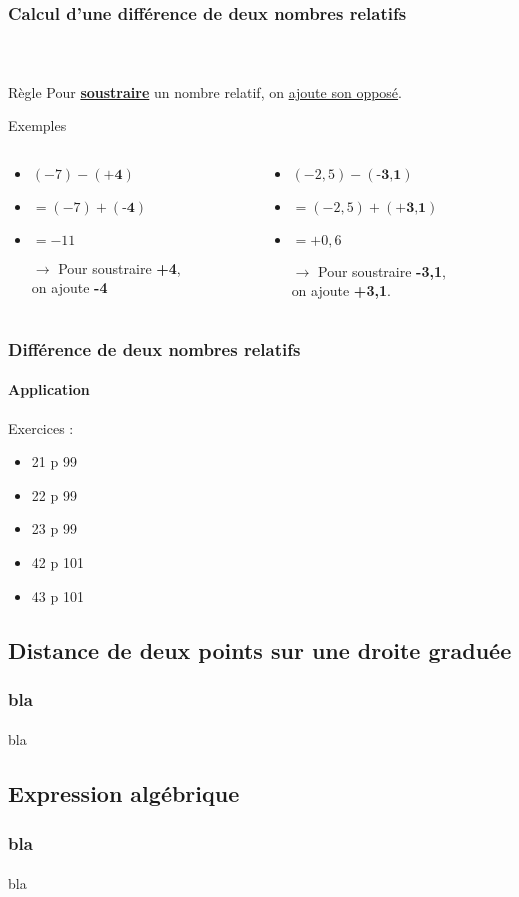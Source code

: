 \documentclass{beamer}
\begin{document}
\begin{frame}
	\frametitle{Calcul d'une différence de deux nombres relatifs}  
	\framesubtitle{\ }	
	
	\begin{block}{Règle}
		Pour \textbf{\underline{soustraire}} un nombre relatif, on \underline{ajoute son opposé}.
	\end{block}
	
	\begin{exampleblock}{Exemples}
		\begin{columns}[onlytextwidth]
			\begin{column}{0.5\textwidth}
				\begin{itemize}
					\item $ (-7) - (\textbf{+4}) $
					\item $= (-7) + (\textbf{-4}) $
					\item $= -11$
					\item[$\rightarrow$] Pour soustraire \textbf{+4},\\  on ajoute \textbf{-4}\pause
				\end{itemize}
			\end{column}
			\begin{column}{0.5\textwidth}
				\begin{itemize}
					\item $ (-2,5) - (\textbf{-3,1}) $
					\item $= (-2,5) + (\textbf{+3,1}) $
					\item $= +0,6$
					\item[$\rightarrow$] Pour soustraire \textbf{-3,1},\\  on ajoute \textbf{+3,1}.
				\end{itemize}
			\end{column}
		\end{columns}
	\end{exampleblock}
\end{frame}

\begin{frame}
	\frametitle{Différence de deux nombres relatifs}  
	\framesubtitle{Application }	
	
	Exercices :
	\begin{itemize}
		\item 21 p 99
		\item 22 p 99
		\item 23 p 99
		\item 42 p 101
		\item 43 p 101
	\end{itemize}
\end{frame}

\subsection{Distance de deux points sur une droite graduée}

\begin{frame}
	\frametitle{bla}  
	\framesubtitle{}	
	
	bla
\end{frame}

\subsection{Expression algébrique}

\begin{frame}
	\frametitle{bla}  
	\framesubtitle{}	
	
	bla
\end{frame}
\end{document}

